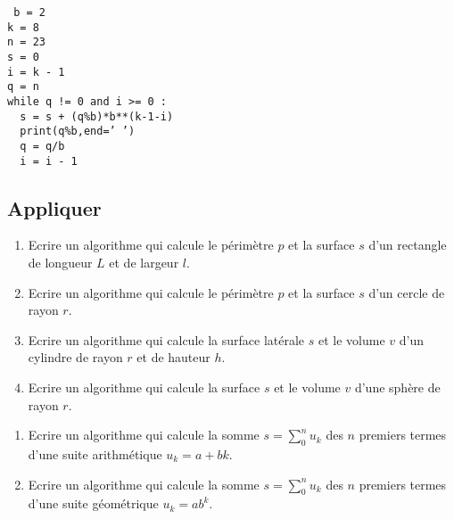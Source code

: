 \begin{td}
\begin{minipage}[t]{8cm}
\begin{enumerate}
	{\footnotesize\tt
	b = 2\\
	k = 8\\
	n = 23\\
	s = 0\\
	i = k - 1\\
	q = n\\
	while q != 0 and i >= 0 :\\
  	\mbox{}\ \ s = s + (q\%b)*b**(k-1-i)\\
  	\mbox{}\ \ print(q\%b,end=' ')\\
  	\mbox{}\ \ q = q/b\\
  	\mbox{}\ \ i = i - 1
	}
\end{enumerate}
\end{minipage}
\end{td}


\subsection{Appliquer}
\begin{td}\label{td:geometrieInstruc}\em {}
\begin{enumerate}
\item Ecrire un algorithme qui calcule le périmètre $p$ et la surface $s$ d'un rectangle de longueur
	$L$ et de largeur $l$.
\item Ecrire un algorithme qui calcule le périmètre $p$ et la surface $s$ d'un cercle de rayon $r$.
\item Ecrire un algorithme qui calcule la surface latérale $s$ et le volume $v$ d'un cylindre de rayon $r$
	et de hauteur $h$.
\item Ecrire un algorithme qui calcule la surface $s$ et le volume $v$ d'une sphère de rayon $r$.
\end{enumerate}
\end{td}

\begin{td}\label{td:suites}\em {}
\begin{enumerate}
\item Ecrire un algorithme qui calcule la somme $s = \sum_0^n u_k$ des $n$ premiers termes d'une suite 
	arithmétique $u_k = a + bk$.
\item Ecrire un algorithme qui calcule la somme $s = \sum_0^n u_k$ des $n$ premiers termes d'une suite 
	géométrique $u_k = ab^k$.
\end{enumerate}
\end{td}

